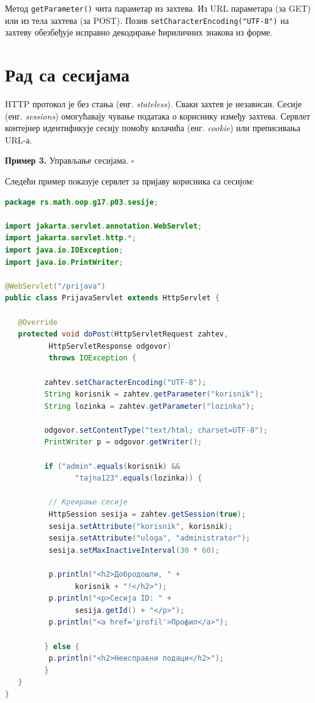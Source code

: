 Метод \texttt{getParameter()} чита параметар из захтева. Из URL параметара (за GET) или из тела захтева (за POST). Позив \texttt{setCharacterEncoding("UTF-8")} на захтеву обезбеђује исправно декодирање ћириличних знакова из форме.


\section{Рад са сесијама}

HTTP протокол је без стања (енг. \textit{stateless}). Сваки захтев је независан. Сесије (енг. \textit{sessions}) омогућавају чување података о кориснику између захтева. Сервлет контејнер идентификује сесију помоћу колачића (енг. \textit{cookie}) или преписивања URL-а.


\bigskip

\noindent \textbf{Пример 3.} Управљање сесијама. $\square$

\medskip

Следећи пример показује сервлет за пријаву корисника са сесијом:


\begin{lstlisting}[language=Java]
package rs.math.oop.g17.p03.sesije;
 
import jakarta.servlet.annotation.WebServlet;
import jakarta.servlet.http.*;
import java.io.IOException;
import java.io.PrintWriter;
 
@WebServlet("/prijava")
public class PrijavaServlet extends HttpServlet {
 
   @Override
   protected void doPost(HttpServletRequest zahtev,
          HttpServletResponse odgovor)
          throws IOException {
 
         zahtev.setCharacterEncoding("UTF-8");
         String korisnik = zahtev.getParameter("korisnik");
         String lozinka = zahtev.getParameter("lozinka");
 
         odgovor.setContentType("text/html; charset=UTF-8");
         PrintWriter p = odgovor.getWriter();
 
         if ("admin".equals(korisnik) &&
                "tajna123".equals(lozinka)) {
 
          // Креирање сесије
          HttpSession sesija = zahtev.getSession(true);
          sesija.setAttribute("korisnik", korisnik);
          sesija.setAttribute("uloga", "administrator");
          sesija.setMaxInactiveInterval(30 * 60);
 
          p.println("<h2>Добродошли, " +
                korisnik + "!</h2>");
          p.println("<p>Сесија ID: " +
                sesija.getId() + "</p>");
          p.println("<a href='profil'>Профил</a>");
 
         } else {
          p.println("<h2>Неисправни подаци</h2>");
         }
   }
}
\end{lstlisting}


